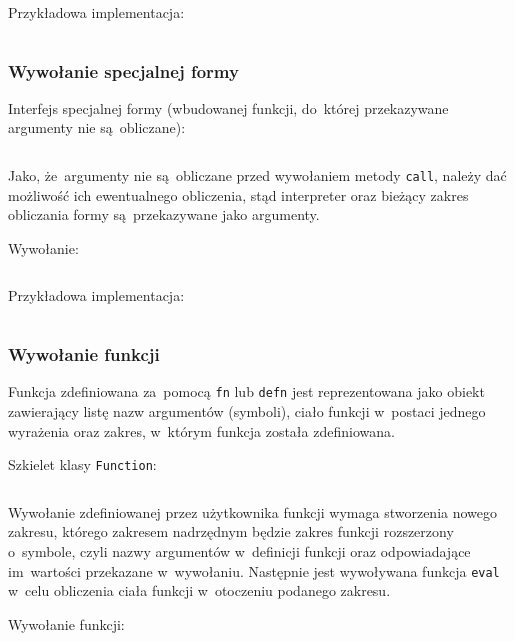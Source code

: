 \documentclass[a4paper,11pt]{article}
\newcommand{\impl}[1]{\inputminted[fontsize=\footnotesize]{java}{impl/#1.java}}
\begin{document}
Przykładowa implementacja:
\impl{MultiplyPrimitive}

\subsubsection{Wywołanie specjalnej formy}

Interfejs specjalnej formy (wbudowanej funkcji, do~której przekazywane
argumenty nie są~obliczane):
\impl{SpecialForm}
Jako, że~argumenty nie są~obliczane przed wywołaniem metody \verb+call+, należy
dać możliwość ich ewentualnego obliczenia, stąd interpreter oraz bieżący zakres
obliczania formy są~przekazywane jako argumenty.

Wywołanie:
\impl{evalSpecialForm}

Przykładowa implementacja:
\impl{IfForm}

\subsubsection{Wywołanie funkcji}

Funkcja zdefiniowana za~pomocą \verb+fn+ lub \verb+defn+ jest reprezentowana
jako obiekt zawierający listę nazw argumentów (symboli), ciało funkcji
w~postaci jednego wyrażenia oraz zakres, w~którym funkcja została zdefiniowana.

Szkielet klasy \verb+Function+:
\impl{Function}

Wywołanie zdefiniowanej przez użytkownika funkcji wymaga stworzenia nowego
zakresu, którego zakresem nadrzędnym będzie zakres funkcji rozszerzony
o~symbole, czyli nazwy argumentów w~definicji funkcji oraz odpowiadające
im~wartości przekazane w~wywołaniu. Następnie jest wywoływana funkcja
\verb+eval+ w~celu obliczenia ciała funkcji w~otoczeniu podanego zakresu.

Wywołanie funkcji:
\impl{evalFunction}
\end{document}
